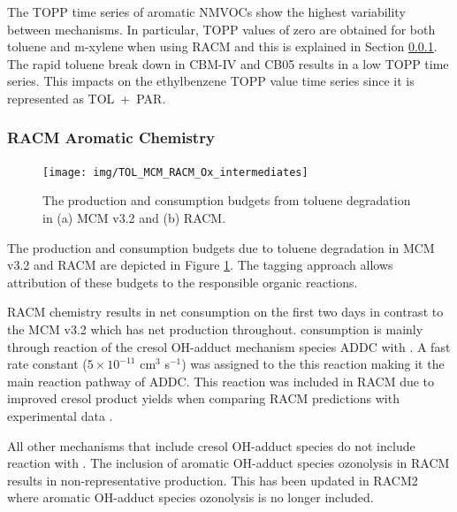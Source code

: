 The TOPP time series of aromatic NMVOCs show the highest variability between mechanisms. 
In particular, TOPP values of zero are obtained for both toluene and m-xylene when using RACM and this is explained in Section \ref{sss:RACM_aromatic}. 
The rapid toluene break down in CBM-IV and CB05 results in a low TOPP time series. 
This impacts on the ethylbenzene TOPP value time series since it is represented as \mbox{TOL + PAR}.

\subsubsection{RACM Aromatic Chemistry} \label{sss:RACM_aromatic}

\begin{figure}
    \begin{center}
        \texttt{[image: img/TOL\_MCM\_RACM\_Ox\_intermediates]}
    \end{center}
    \caption{The  production and consumption budgets from toluene degradation in (a) MCM v3.2 and (b) RACM.}
    \label{f:TOL_MCM_RACM}
\end{figure}

The  production and consumption budgets due to toluene degradation in MCM v3.2 and RACM are depicted in Figure \ref{f:TOL_MCM_RACM}. 
The tagging approach allows attribution of these budgets to the responsible organic reactions.

RACM chemistry results in net  consumption on the first two days in contrast to the MCM v3.2 which has net  production throughout. 
 consumption is mainly through reaction of the cresol OH-adduct mechanism species ADDC with . 
A fast rate constant ($5 \times 10^{-11}$ cm$^3$ s$^{-1}$) was assigned to the this reaction making it the main reaction pathway of ADDC. 
This reaction was included in RACM due to improved cresol product yields when comparing RACM predictions with experimental data \citep{Stockwell:1997}.

All other mechanisms that include cresol OH-adduct species do not include reaction with . 
The inclusion of aromatic OH-adduct species ozonolysis in RACM results in non-representative  production. 
This has been updated in RACM2 where aromatic OH-adduct species ozonolysis is no longer included.
